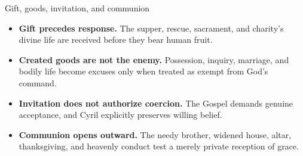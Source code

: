 \begin{studybox}{Gift, goods, invitation, and communion}
\begin{itemize}[topsep=0pt,itemsep=0.2em,parsep=0pt]
\item \textbf{Gift precedes response.} The supper, rescue, sacrament, and charity's divine life are received before they bear human fruit.
\item \textbf{Created goods are not the enemy.} Possession, inquiry, marriage, and bodily life become excuses only when treated as exempt from God's command.
\item \textbf{Invitation does not authorize coercion.} The Gospel demands genuine acceptance, and Cyril explicitly preserves willing belief.
\item \textbf{Communion opens outward.} The needy brother, widened house, altar, thanksgiving, and heavenly conduct test a merely private reception of grace.
\end{itemize}
\end{studybox}
